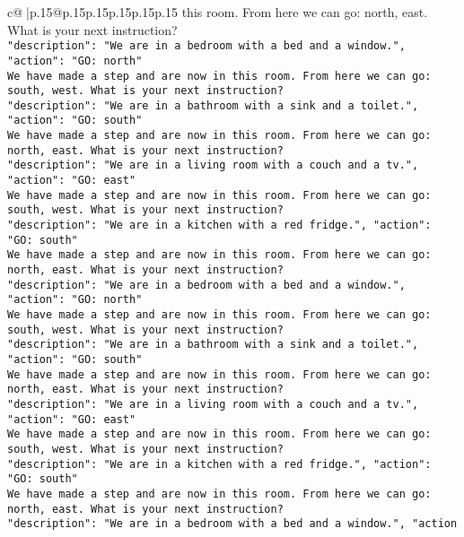 \documentclass{article}
\begin{document}
{\begin{supertabular}{c@{$\;$}|p{.15\linewidth}@{}p{.15\linewidth}p{.15\linewidth}p{.15\linewidth}p{.15\linewidth}p{.15\linewidth}}
{{{this room. From here we can go: north, east. What is your next instruction?\\ \tt {"description": "We are in a bedroom with a bed and a window.", "action": "GO: north"}\\ \tt We have made a step and are now in this room. From here we can go: south, west. What is your next instruction?\\ \tt {"description": "We are in a bathroom with a sink and a toilet.", "action": "GO: south"}\\ \tt We have made a step and are now in this room. From here we can go: north, east. What is your next instruction?\\ \tt {"description": "We are in a living room with a couch and a tv.", "action": "GO: east"}\\ \tt We have made a step and are now in this room. From here we can go: south, west. What is your next instruction?\\ \tt {"description": "We are in a kitchen with a red fridge.", "action": "GO: south"}\\ \tt We have made a step and are now in this room. From here we can go: north, east. What is your next instruction?\\ \tt {"description": "We are in a bedroom with a bed and a window.", "action": "GO: north"}\\ \tt We have made a step and are now in this room. From here we can go: south, west. What is your next instruction?\\ \tt {"description": "We are in a bathroom with a sink and a toilet.", "action": "GO: south"}\\ \tt We have made a step and are now in this room. From here we can go: north, east. What is your next instruction?\\ \tt {"description": "We are in a living room with a couch and a tv.", "action": "GO: east"}\\ \tt We have made a step and are now in this room. From here we can go: south, west. What is your next instruction?\\ \tt {"description": "We are in a kitchen with a red fridge.", "action": "GO: south"}\\ \tt We have made a step and are now in this room. From here we can go: north, east. What is your next instruction?\\ \tt {"description": "We are in a bedroom with a bed and a window.", "action 
	  } 
	   } 
	   } 
	  \\ 
 

}
\end{supertabular}}
\end{document}
